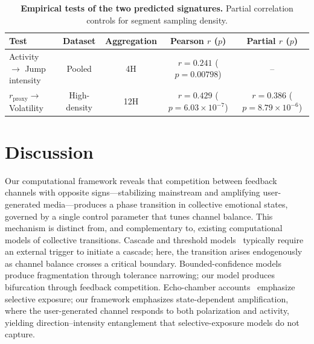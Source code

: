 \documentclass[12pt]{article}
\begin{document}
\begin{table}[H]
  \centering
  \caption{\textbf{Empirical tests of the two predicted signatures.} Partial correlation controls for segment sampling density.}
  \label{tab:empirical}
  \footnotesize
  \setlength{\tabcolsep}{4pt}
  \begin{tabularx}{\linewidth}{YCCCC}
    \hline
    Test & Dataset & Aggregation & Pearson $r$ ($p$) & Partial $r$ ($p$) \\
    \hline
    Activity $\to$ Jump intensity & Pooled & 4H & $r=0.241$ ($p=0.00798$) & -- \\
    $r_{\text{proxy}}\to$ Volatility & High-density & 12H & $r=0.429$ ($p=6.03\times 10^{-7}$) & $r=0.386$ ($p=8.79\times 10^{-6}$) \\
    \hline
  \end{tabularx}
\end{table}

\FloatBarrier

\section{Discussion}
\label{sec:discussion}

Our computational framework reveals that competition between feedback channels with opposite signs---stabilizing mainstream and amplifying user-generated media---produces a phase transition in collective emotional states, governed by a single control parameter that tunes channel balance. This mechanism is distinct from, and complementary to, existing computational models of collective transitions. Cascade and threshold models~\cite{Granovetter1978,Watts2002,CentolaMacy2007} typically require an external trigger to initiate a cascade; here, the transition arises endogenously as channel balance crosses a critical boundary. Bounded-confidence models~\cite{Deffuant2000,HegselmannKrause2002} produce fragmentation through tolerance narrowing; our model produces bifurcation through feedback competition. Echo-chamber accounts~\cite{Bakshy2015,DelVicario2016SciRep,DelVicario2016PNAS} emphasize selective exposure; our framework emphasizes state-dependent amplification, where the user-generated channel responds to both polarization and activity, yielding direction--intensity entanglement that selective-exposure models do not capture.
\end{document}

